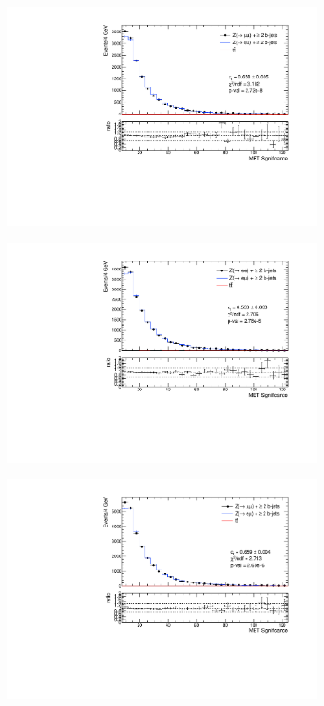 \documentclass{article}
\begin{document}
\begin{figure}
\begin{center}
\begin{subfigure}[b]{0.45\textwidth}
	\end{subfigure}
	\begin{subfigure}[b]{0.45\textwidth}
		\includegraphics[width=\linewidth]{Zmm_METsig_2017.pdf}
	\end{subfigure}
	\begin{subfigure}[b]{0.45\textwidth}
		\includegraphics[width=\linewidth]{Zee_METsig_2018.pdf}
	\end{subfigure}
	\begin{subfigure}[b]{0.45\textwidth}
		\includegraphics[width=\linewidth]{Zmm_METsig_2018.pdf}

\end{subfigure}
\end{center}
\end{figure}
\end{document}

